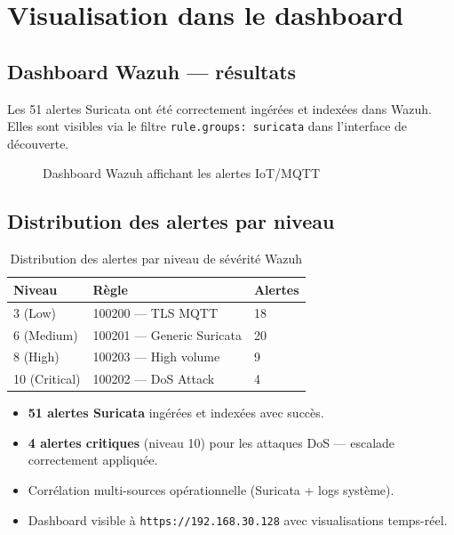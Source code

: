 \section{Visualisation dans le dashboard}

\subsection{Dashboard Wazuh — résultats}

Les 51 alertes Suricata ont été correctement ingérées et indexées dans Wazuh. Elles sont visibles via le filtre \texttt{rule.groups: suricata} dans l'interface de découverte.

\begin{figure}[H]
  \centering
  \caption{Dashboard Wazuh affichant les alertes IoT/MQTT}
  \label{fig:wazuh_dashboard}
\end{figure}

\subsection{Distribution des alertes par niveau}

\begin{table}[H]
\centering
\caption{Distribution des alertes par niveau de sévérité Wazuh}
\label{tab:wazuh_levels}
\begin{tabular}{lll}
\toprule
\textbf{Niveau} & \textbf{Règle} & \textbf{Alertes} \\
\midrule
3 (Low) & 100200 — TLS MQTT & 18 \\
6 (Medium) & 100201 — Generic Suricata & 20 \\
8 (High) & 100203 — High volume & 9 \\
10 (Critical) & 100202 — DoS Attack & 4 \\
\bottomrule
\end{tabular}
\end{table}

\begin{tcolorbox}[colback=green!5, colframe=green!50!black, title=Résultats Wazuh SIEM]
\begin{itemize}
  \item \textbf{51 alertes Suricata} ingérées et indexées avec succès.
  \item \textbf{4 alertes critiques} (niveau 10) pour les attaques DoS — escalade correctement appliquée.
  \item Corrélation multi-sources opérationnelle (Suricata + logs système).
  \item Dashboard visible à \texttt{https://192.168.30.128} avec visualisations temps-réel.
\end{itemize}
\end{tcolorbox}
